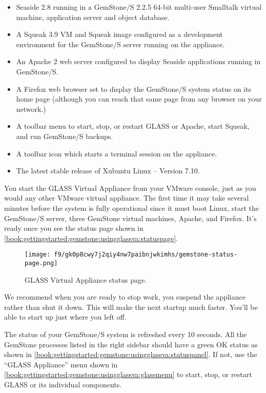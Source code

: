 \documentclass[a4paper,10pt,twoside]{book}
\begin{document}
\begin{itemize}
\item  Seaside 2.8 running in a GemStone$/$S 2.2.5 64-bit multi-user Smalltalk virtual machine, application server and object database. 
\item  A Squeak 3.9 VM and Squeak image configured as a development environment  for the GemStone$/$S server running on the appliance. 
\item  An Apache 2 web server configured to display Seaside applications running in GemStone$/$S.
\item  A Firefox web browser set to display the GemStone$/$S system status on its home page (although you can reach that same page from any browser on your network.) 
\item  A toolbar menu to start, stop, or restart GLASS or Apache, start Squeak, and run GemStone$/$S backups.
\item  A toolbar icon which starts a terminal session on the appliance.
\item  The latest stable release of Xubuntu Linux -- Version 7.10.
\end{itemize}

You start the GLASS Virtual Appliance from your VMware console, just as you would any other VMware virtual appliance. The first time it may take several minutes before the system is fully operational since it must boot Linux, start the GemStone$/$S server, three GemStone virtual machines, Apache, and Firefox. It's ready once you see the status page shown in \autoref{book:gettingstarted:gemstone:usingglassva:statuspage}.

\begin{figure}[h!tbp]
	\begin{center}
		\texttt{[image: f9/gk0p8cwy7j2qiy4nw7paibnjwkimhs/gemstone-status-page.png]}
		\caption{GLASS Virtual Appliance status page.\label{book:gettingstarted:gemstone:usingglassva:statuspage}}
	\end{center}
\end{figure}


We recommend when you are ready to stop work, you suspend the appliance rather than shut it down. This will make the next startup much faster. You'll be able to start up just where you left off.

The status of your GemStone$/$S system is refreshed every 10 seconds. All the GemStone processes listed in the right sidebar should have a green OK status as shown in \autoref{book:gettingstarted:gemstone:usingglassva:statuspanel}. If not, use the ``GLASS Appliance'' menu shown in \autoref{book:gettingstarted:gemstone:usingglassva:glassmenu} to start, stop, or restart GLASS or its individual components. 
\end{document}
